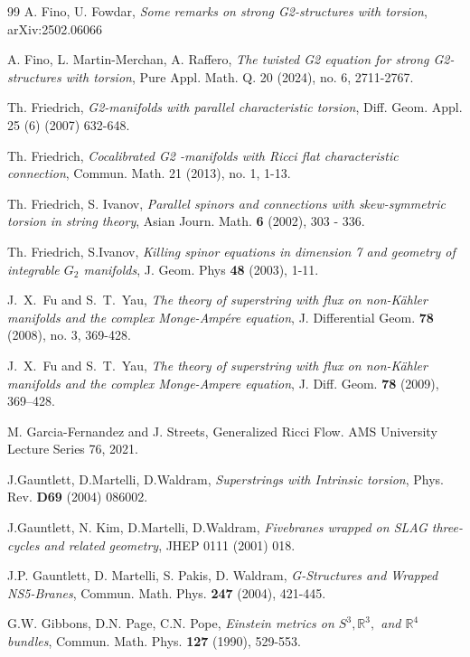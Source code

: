 \documentclass[10pt,british]{article}
\begin{document}
\begin{thebibliography}{99}
 A. Fino, U. Fowdar, \emph{Some remarks on strong G2-structures with torsion}, arXiv:2502.06066

 A. Fino, L. Martin-Merchan, A. Raffero, \emph{The twisted G2 equation for strong G2-structures with torsion}, Pure Appl. Math. Q. 20 (2024), no. 6, 2711-2767.%

 Th. Friedrich, \emph{G2-manifolds with parallel characteristic torsion}, Diff. Geom. Appl. 25 (6) (2007) 632-648.

  Th. Friedrich,  \emph{Cocalibrated  G2 -manifolds with Ricci flat characteristic connection}, 
Commun. Math. 21 (2013), no. 1, 1-13.

 Th. Friedrich, S. Ivanov,  \emph{Parallel spinors and connections with skew-symmetric
torsion in string theory},  Asian Journ.
Math. {\bf 6} (2002), 303 - 336.

 Th. Friedrich, S.Ivanov, {\em Killing spinor equations in
  dimension 7 and geometry of integrable $G_2$ manifolds}, J. Geom. Phys
  {\bf 48} (2003), 1-11.
  
  J.~X.~Fu and S.~T.~Yau, \emph{The theory of superstring with flux on non-K\"ahler manifolds and the complex Monge-Amp\'ere equation}, J. Differential Geom. \textbf{78} (2008), no. 3, 369-428.

  J.~X.~Fu and S.~T.~Yau, \emph{The theory of superstring with flux on non-K\"ahler manifolds and the complex Monge-Ampere equation}, J. Diff. Geom. \textbf{78} (2009), 369--428.

 M. Garcia-Fernandez and J. Streets, Generalized Ricci Flow. AMS University Lecture Series 76, 2021. 


  
   J.Gauntlett, D.Martelli, D.Waldram, {\em Superstrings with   Intrinsic torsion}, Phys. Rev. {\bf D69} (2004) 086002.

 J.Gauntlett, N. Kim, D.Martelli, D.Waldram, {\em Fivebranes
  wrapped on SLAG three-cycles and related geometry}, JHEP 0111 (2001) 018.

 J.P. Gauntlett, D. Martelli, S. Pakis, D. Waldram,
{\em  G-Structures and Wrapped NS5-Branes}, Commun. Math. Phys.
{\bf 247} (2004), 421-445.

 G.W. Gibbons, D.N. Page, C.N. Pope, {\em Einstein metrics
on $S^3,\mathbb R^3,$ and $\mathbb R^4$ bundles}, Commun. Math. Phys. {\bf 127}
(1990), 529-553.


\end{thebibliography}
\end{document}
